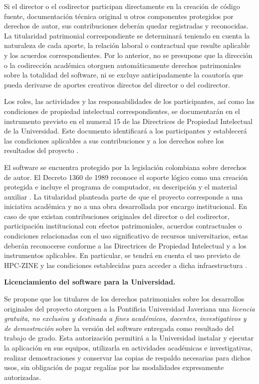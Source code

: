 Si el director o el codirector participan directamente en la creación de código fuente, documentación técnica original u otros componentes protegidos por derechos de autor, sus contribuciones deberán quedar registradas y reconocidas. La titularidad patrimonial correspondiente se determinará teniendo en cuenta la naturaleza de cada aporte, la relación laboral o contractual que resulte aplicable y los acuerdos correspondientes. Por lo anterior, no se presupone que la dirección o la codirección académica otorguen automáticamente derechos patrimoniales sobre la totalidad del software, ni se excluye anticipadamente la coautoría que pueda derivarse de aportes creativos directos del director o del codirector.

Los roles, las actividades y las responsabilidades de los participantes, así como las condiciones de propiedad intelectual correspondientes, se documentarán en el instrumento previsto en el numeral 15 de las Directrices de Propiedad Intelectual de la Universidad. Este documento identificará a los participantes y establecerá las condiciones aplicables a sus contribuciones y a los derechos sobre los resultados del proyecto \cite{vfpJaverianaDirectrices2018}.

El software se encuentra protegido por la legislación colombiana sobre derechos de autor. El Decreto 1360 de 1989 reconoce el soporte lógico como una creación protegida e incluye el programa de computador, su descripción y el material auxiliar \cite{vfpDecreto1360}. La titularidad planteada parte de que el proyecto corresponde a una iniciativa académica y no a una obra desarrollada por encargo institucional. En caso de que existan contribuciones originales del director o del codirector, participación institucional con efectos patrimoniales, acuerdos contractuales o condiciones relacionadas con el uso significativo de recursos universitarios, estas deberán reconocerse conforme a las Directrices de Propiedad Intelectual y a los instrumentos aplicables. En particular, se tendrá en cuenta el uso previsto de HPC-ZINE y las condiciones establecidas para acceder a dicha infraestructura \cite{vfpHPCZINE}.

\textbf{Licenciamiento del software para la Universidad.}

Se propone que los titulares de los derechos patrimoniales sobre los desarrollos originales del proyecto otorguen a la Pontificia Universidad Javeriana una \emph{licencia gratuita, no exclusiva y destinada a fines académicos, docentes, investigativos y de demostración} sobre la versión del software entregada como resultado del trabajo de grado. Esta autorización permitirá a la Universidad instalar y ejecutar la aplicación en sus equipos, utilizarla en actividades académicas e investigativas, realizar demostraciones y conservar las copias de respaldo necesarias para dichos usos, sin obligación de pagar regalías por las modalidades expresamente autorizadas.

